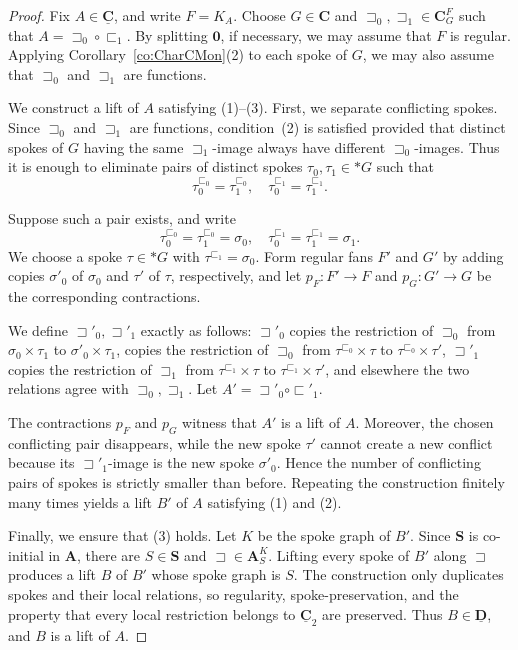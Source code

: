 \documentclass[12pt]{amsart}
\numberwithin{equation}{section}
\theoremstyle{plain}
\theoremstyle{definition}
\newcommand \sqsp{\sqsupset}
\newcommand \sqsb{\sqsubset}
\newcommand \rt{\mathbf{0}}
\newcommand \AAb{\mathbf{A}}
\newcommand \CCb{\mathbf{C}}
\newcommand \SSb{\mathbf{S}}
\newcommand \CCub{\underline{\mathbf{C}}}
\newcommand \DDub{\underline{\mathbf{D}}}
\begin{document}
\begin{proof}
	Fix $A\in\CCub$, and write $F=K_A$. Choose $G\in\CCb$ and
	$\sqsp_0,\sqsp_1\in\CCb_G^F$ such that $A=\sqsp_0\circ\sqsb_1$. 
	By splitting $\rt$, if necessary, we may assume that $F$ is regular.
	Applying Corollary~\ref{co:CharCMon}(2) to each spoke of $G$, we may
	also assume that $\sqsp_0$ and $\sqsp_1$ are functions.
	
	We construct a lift of $A$ satisfying (1)--(3). First, we separate conflicting spokes. Since $\sqsp_0$ and $\sqsp_1$ are functions, condition~(2) is satisfied
	provided that distinct spokes of $G$ having the same
	$\sqsp_1$-image always have different $\sqsp_0$-images. Thus it is
	enough to eliminate pairs of distinct spokes
	$\tau_0,\tau_1\in *G$ such that
	\[
	\tau_0^{\sqsb_0}=\tau_1^{\sqsb_0},
	\quad
	\tau_0^{\sqsb_1}=\tau_1^{\sqsb_1}.
	\]
	
	Suppose such a pair exists, and write
	\[
	\tau_0^{\sqsb_0}=\tau_1^{\sqsb_0}=\sigma_0,
	\quad
	\tau_0^{\sqsb_1}=\tau_1^{\sqsb_1}=\sigma_1.
	\]
	We choose a spoke $\tau\in *G$ with
	$\tau^{\sqsb_1}=\sigma_0$.
	Form regular fans $F'$ and $G'$ by adding copies
	$\sigma'_0$ of $\sigma_0$ and $\tau'$ of $\tau$, respectively,
	and let
	$p_F:F'\to F$ and $p_G:G'\to G$
	be the corresponding contractions.
	
	We define $\sqsp'_0,\sqsp'_1$ exactly as follows:
	$\sqsp'_0$ copies the restriction of $\sqsp_0$ from
	$\sigma_0\times\tau_1$ to $\sigma'_0\times\tau_1$,
	copies the restriction of $\sqsp_0$ from
	$\tau^{\sqsb_0}\times\tau$ to
	$\tau^{\sqsb_0}\times\tau'$,
	$\sqsp'_1$ copies the restriction of $\sqsp_1$ from
	$\tau^{\sqsb_1}\times\tau$ to
	$\tau^{\sqsb_1}\times\tau'$,
	and elsewhere the two relations agree with
	$\sqsp_0,\sqsp_1$.
	Let $A'=\sqsp'_0\circ\sqsb'_1$.
	
	The contractions $p_F$ and $p_G$ witness that $A'$ is a lift of $A$.
	Moreover, the chosen conflicting pair disappears, while the new spoke
	$\tau'$ cannot create a new conflict because its
	$\sqsp'_1$-image is the new spoke $\sigma'_0$.
	Hence the number of conflicting pairs of spokes is strictly smaller
	than before. Repeating the construction finitely many times yields a
	lift $B'$ of $A$ satisfying (1) and (2).
	
	Finally, we ensure that (3) holds. Let $K$ be the spoke graph of $B'$. Since $\SSb$ is co-initial in $\AAb$, there are $S\in\SSb$ and $\sqsp\in\AAb^K_S$. 
	Lifting every spoke of $B'$ along $\sqsp$ produces a lift $B$ of $B'$ whose spoke graph is $S$. The construction only duplicates spokes and their local relations, so regularity, spoke-preservation, and the property that every local restriction belongs to $\CCub_2$ are preserved. Thus $B\in\DDub$, and $B$ is a lift of $A$.
	
\end{proof}
\end{document}
